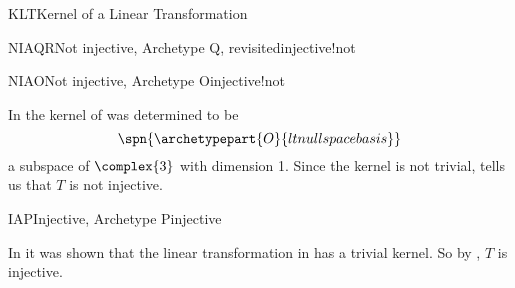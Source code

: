 \begin{subsect}{KLT}{Kernel of a Linear Transformation}
\begin{example}{NIAQR}{Not injective, Archetype Q, revisited}{injective!not}
%
\end{example}
%
\begin{example}{NIAO}{Not injective, Archetype O}{injective!not}
\begin{para}In  the kernel of  was determined to be
%
\begin{equation*}
\spn{\archetypepart{O}{ltnullspacebasis}}\end{equation*}
%
a subspace of $\complex{3}$ with dimension 1.  Since the kernel is not trivial,  tells us that $T$ is not injective.\end{para}
%
\end{example}
%
\begin{example}{IAP}{Injective, Archetype P}{injective}
\begin{para}In  it was shown that the linear transformation in  has a trivial kernel.  So by , $T$ is injective.\end{para}
\end{example}
%
%
\end{subsect}
%
